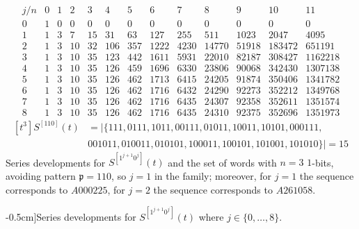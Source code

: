 
\begin{table}
\begin{equation*}
    \begin{array}{c|cccccccccccc}
        j/n & 0 & 1 & 2 & 3 & 4 & 5 & 6 & 7 & 8 & 9 & 10 & 11\\\hline0 & 1 & 0 & 0 & 0 & 0 & 0 & 0 & 0 & 0 & 0 & 0 & 0\\1 & 1 & 3 & 7 & 15 & 31 & 63 & 127 & 255 & 511 & 1023 & 2047 & 4095\\2 & 1 & 3 & 10 & 32 & 106 & 357 & 1222 & 4230 & 14770 & 51918 & 183472 & 651191\\3 & 1 & 3 & 10 & 35 & 123 & 442 & 1611 & 5931 & 22010 & 82187 & 308427 & 1162218\\4 & 1 & 3 & 10 & 35 & 126 & 459 & 1696 & 6330 & 23806 & 90068 & 342430 & 1307138\\5 & 1 & 3 & 10 & 35 & 126 & 462 & 1713 & 6415 & 24205 & 91874 & 350406 & 1341782\\6 & 1 & 3 & 10 & 35 & 126 & 462 & 1716 & 6432 & 24290 & 92273 & 352212 & 1349768\\7 & 1 & 3 & 10 & 35 & 126 & 462 & 1716 & 6435 & 24307 & 92358 & 352611 & 1351574\\8 & 1 & 3 & 10 & 35 & 126 & 462 & 1716 & 6435 & 24310 & 92375 & 352696 & 1351973
    \end{array}
\end{equation*}
\begin{displaymath}
\begin{split}
[t^{3}]S^{[110]}(t) &= \big|\lbrace 111, 0111, 1011, 00111, 01011, 10011, 10101, 000111, \\
& 001011, 010011, 010101, 100011, 100101, 101001, 101010\rbrace\big| = 15
\end{split}
\end{displaymath}
Series developments for $S^{[1^{j+1}0^j]}(t)$
and the set of words with $n=3$ $1$-bits, avoiding pattern $\mathfrak{p}=110$,
so $j=1$ in the family; moreover, for $j=1$ the sequence corresponds to
$A000225$, for $j=2$ the sequence corresponds to $A261058$.
\caption[][-0.5cm]{Series developments for $S^{[1^{j+1}0^j]}(t)$ where $j\in
\lbrace 0,\ldots,8 \rbrace$.}

\label{tbl:S1_j1:0_j}
\end{table}

